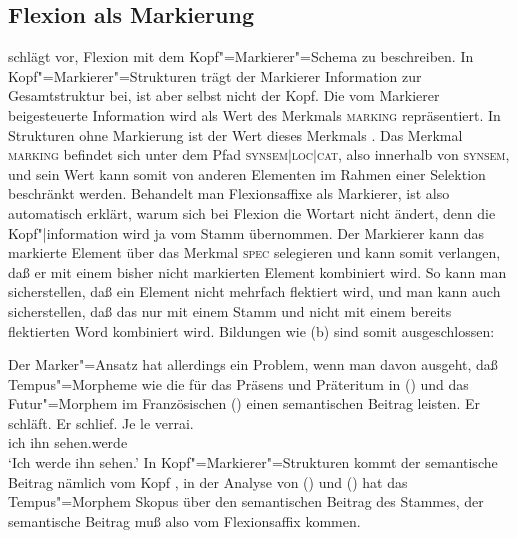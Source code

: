 \subsection{Flexion als Markierung}
\label{sec-flex-mark}

 schlägt vor, Flexion mit dem Kopf"=Markierer"=Schema
\citep[]{ps2} zu beschreiben. In Kopf"=Markierer"=Strukturen trägt der Markierer Information
zur Gesamtstruktur bei, ist aber selbst nicht der Kopf. Die vom Markierer beigesteuerte Information
wird als Wert des Merkmals \textsc{marking} repräsentiert. In Strukturen ohne
Markierung ist der Wert dieses Merkmals . Das Merkmal \textsc{marking} befindet sich
unter dem Pfad \textsc{synsem$|$loc$|$cat}, also innerhalb von \textsc{synsem}, und sein Wert kann somit
von anderen Elementen im Rahmen einer Selektion beschränkt werden. Behandelt man Flexionsaffixe als
Markierer, ist also automatisch erklärt, warum sich bei Flexion die Wortart nicht ändert, denn die
Kopf"|information wird ja vom Stamm übernommen. Der Markierer kann das markierte Element über das
Merkmal \textsc{spec} selegieren und kann somit verlangen, daß er mit einem bisher nicht markierten
Element kombiniert wird. So kann man sicherstellen, daß ein Element nicht mehrfach flektiert wird,
und man kann auch sicherstellen, daß \zb das \bars nur mit einem Stamm und nicht mit einem bereits
flektierten Word kombiniert wird.  Bildungen wie (b) sind somit ausgeschlossen:

\eal
{}
\zl

\noindent
Der Marker"=Ansatz hat allerdings ein Problem, wenn man davon ausgeht, daß Tempus"=Morpheme
wie die für das Präsens und Präteritum in () und das Futur"=Morphem im Französischen
() einen semantischen Beitrag leisten.
\eal
\ex Er schläft.
\ex Er schlief.
\zl
\ea
\gll Je le verrai.\\
     ich ihn sehen.werde\\
\glt `Ich werde ihn sehen.'
\z
In Kopf"=Markierer"=Strukturen kommt der semantische Beitrag nämlich vom Kopf \citep[]{ps2}, in der Analyse
von () und () hat das Tempus"=Morphem Skopus über den semantischen Beitrag des Stammes,
der semantische Beitrag muß also vom Flexionsaffix kommen.

